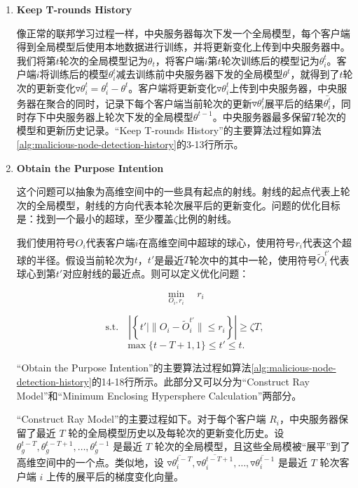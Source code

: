 \documentclass[lettersize,journal]{IEEEtran}
\begin{document}
\begin{enumerate}

\item \textbf{Keep T-rounds History}

像正常的联邦学习过程一样，中央服务器每次下发一个全局模型，每个客户端得到全局模型后使用本地数据进行训练，并将更新变化上传到中央服务器中。我们将第$t$轮次的全局模型记为$\theta_t$，将客户端$i$第$t$轮次训练后的模型记为$\theta^t_i$。客户端$i$将训练后的模型$\theta^t_{i}$减去训练前中央服务器下发的全局模型$\theta^t$，就得到了$t$轮次的更新变化$\triangledown \theta^t_{i}=\theta^t_{i}-\theta^t$。客户端将更新变化$\triangledown \theta^t_{i}$上传到中央服务器，中央服务器在聚合的同时，记录下每个客户端当前轮次的更新$\triangledown \theta^t_{i}$展平后的结果$\bar{\theta_i^t}$，同时存下中央服务器上轮次下发的全局模型$\theta^{t-1}$。中央服务器最多保留$T$轮次的模型和更新历史记录。“Keep T-rounds History”的主要算法过程如算法\ref{alg:malicious-node-detection-history}的3-13行所示。%

\item \textbf{Obtain the Purpose Intention}

这个问题可以抽象为高维空间中的一些具有起点的射线。射线的起点代表上轮次的全局模型，射线的方向代表本轮次展平后的更新变化。问题的优化目标是：找到一个最小的超球，至少覆盖$\zeta$比例的射线。

我们使用符号$O_i$代表客户端$i$在高维空间中超球的球心，使用符号$r_i$代表这个超球的半径。假设当前轮次为$t$，$t'$是最近$T$轮次中的其中一轮，使用符号$\tilde O_i^{t'}$代表球心到第$t'$对应射线的最近点。则可以定义优化问题：

\begin{equation}
    \min_{O_i, r_i} \quad r_i
\end{equation}

\begin{equation} 
\text{s.t.} \quad \left| \left\{ t' \mid \| O_i - \tilde{O}_{i}^{t'} \| \leq r_i \right\} \right| \geq \zeta T,
\end{equation}
\begin{equation} 
    \max\{t-T+1, 1\}\leq  t'\leq t.
\end{equation}

“Obtain the Purpose Intention”的主要算法过程如算法\ref{alg:malicious-node-detection-history}的14-18行所示。此部分又可以分为“Construct Ray Model”和“Minimum Enclosing Hypersphere Calculation”两部分。

“Construct Ray Model”的主要过程如下。对于每个客户端 \(R_i\)，中央服务器保留了最近 \(T\) 轮的全局模型历史以及每轮次的更新变化历史。设 \( \theta_g^{t-T}, \theta_g^{t-T+1}, \dots, \theta_g^{t-1} \) 是最近 \(T\) 轮次的全局模型，且这些全局模被“展平”到了高维空间中的一个点。类似地，设 \( \overline{\triangledown\theta_{i}^{t-T}}, \overline{\triangledown\theta_{i}^{t-T+1}}, \dots, \overline{\triangledown\theta_{i}^{t-1}} \) 是最近 \(T\) 轮次客户端 \(i\) 上传的展平后的梯度变化向量。


\end{enumerate}
\end{document}
